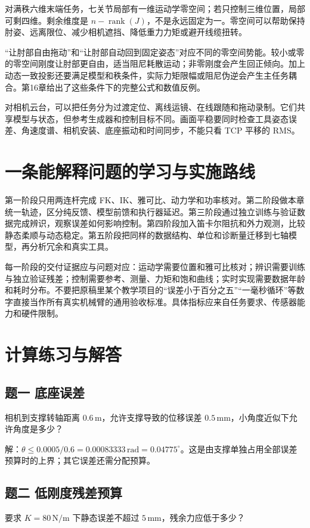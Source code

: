 对满秩六维末端任务，七关节局部有一维运动学零空间；若只控制三维位置，局部可剩四维。剩余维度是 $n-\operatorname{rank}(J)$，不是永远固定为一。零空间可以帮助保持肘姿、远离限位、减少相机遮挡、降低重力力矩或避开线缆扭转。

“让肘部自由拖动”和“让肘部自动回到固定姿态”对应不同的零空间势能。较小或零的零空间刚度让肘部更自由，适当阻尼耗散运动；非零刚度会产生回正倾向。加上动态一致投影还要满足模型和秩条件，实际力矩限幅或阻尼伪逆会产生主任务耦合。第16章给出了这些条件下的完整公式和数值反例。

对相机云台，可以把任务分为过渡定位、离线运镜、在线跟随和拖动录制。它们共享模型与状态，但参考生成器和控制目标不同。画面平稳要同时检查工具姿态误差、角速度谱、相机安装、底座振动和时间同步，不能只看 TCP 平移的 RMS。

\section{一条能解释问题的学习与实施路线}

第一阶段只用两连杆完成 FK、IK、雅可比、动力学和功率核对。第二阶段做本章统一轨迹，区分纯反馈、模型前馈和执行器延迟。第三阶段通过独立训练与验证数据完成辨识，观察误差如何影响控制。第四阶段加入笛卡尔阻抗和外力观测，比较静态柔顺与动态稳定。第五阶段把同样的数据结构、单位和诊断量迁移到七轴模型，再分析冗余和真实工具。

每一阶段的交付证据应与问题对应：运动学需要位置和雅可比核对；辨识需要训练与独立验证残差；控制需要参考、测量、力矩和饱和曲线；实时实现需要数据年龄和耗时分布。不要把原稿里某个教学项目的“误差小于百分之五”“一毫秒循环”等数字直接当作所有真实机械臂的通用验收标准。具体指标应来自任务要求、传感器能力和硬件限制。

\section{计算练习与解答}

\subsection*{题一 底座误差}
相机到支撑转轴距离 $0.6\,\mathrm m$，允许支撑导致的位移误差 $0.5\,\mathrm{mm}$，小角度近似下允许角度是多少？

解：$\theta\le0.0005/0.6=0.00083333\,\mathrm{rad}=0.04775^\circ$。这是由支撑单独占用全部误差预算时的上界；其它误差还需分配预算。

\subsection*{题二 低刚度残差预算}
要求 $K=80\,\mathrm{N/m}$ 下静态误差不超过 $5\,\mathrm{mm}$，残余力应低于多少？

